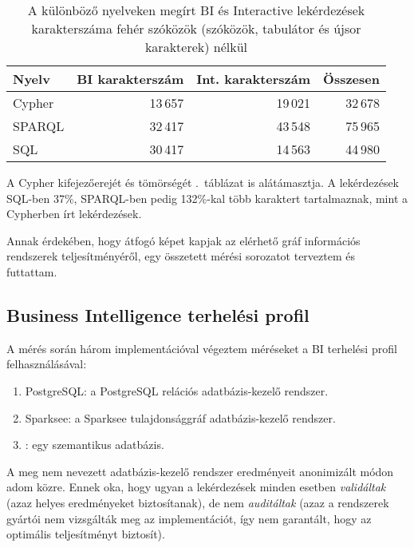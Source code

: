 \begin{table}[h]
	\centering
	\begin{tabular}{|l|r|r|r|}
		\toprule
		\multicolumn{1}{l}{Nyelv} & \multicolumn{1}{l}{BI karakterszám} & \multicolumn{1}{l}{Int. karakterszám}& \multicolumn{1}{l}{Összesen} \\
		\midrule
		Cypher & 13\,657 & 19\,021 & 32\,678 \\
		SPARQL & 32\,417 & 43\,548 & 75\,965 \\
		SQL    & 30\,417 & 14\,563 & 44\,980 \\
		\bottomrule
	\end{tabular}
	\caption{A különböző nyelveken megírt BI és Interactive lekérdezések karakterszáma fehér szóközök (szóközök, tabulátor és újsor karakterek) nélkül}
	\label{tab:char-count}
\end{table}

A Cypher kifejezőerejét és tömörségét .~táblázat is alátámasztja. A lekérdezések SQL-ben 37\%, SPARQL-ben pedig 132\%-kal több karaktert tartalmaznak, mint a Cypherben írt lekérdezések.

Annak érdekében, hogy átfogó képet kapjak az elérhető gráf információs rendszerek teljesítményéről, egy összetett mérési sorozatot terveztem és futtattam.

\subsection{Business Intelligence terhelési profil}

A mérés során három implementációval végeztem méréseket a BI terhelési profil felhasználásával:

\begin{enumerate}
	\item PostgreSQL: a PostgreSQL relációs adatbázis-kezelő rendszer.
	\item Sparksee: a Sparksee tulajdonsággráf adatbázis-kezelő rendszer.
	\item \stardog: egy szemantikus adatbázis.
\end{enumerate}

A meg nem nevezett adatbázis-kezelő rendszer eredményeit anonimizált módon adom közre. Ennek oka, hogy ugyan a lekérdezések minden esetben \emph{validáltak} (azaz helyes eredményeket biztosítanak), de nem \emph{auditáltak} (azaz a rendszerek gyártói nem vizsgálták meg az implementációt, így nem garantált, hogy az optimális teljesítményt biztosít).

